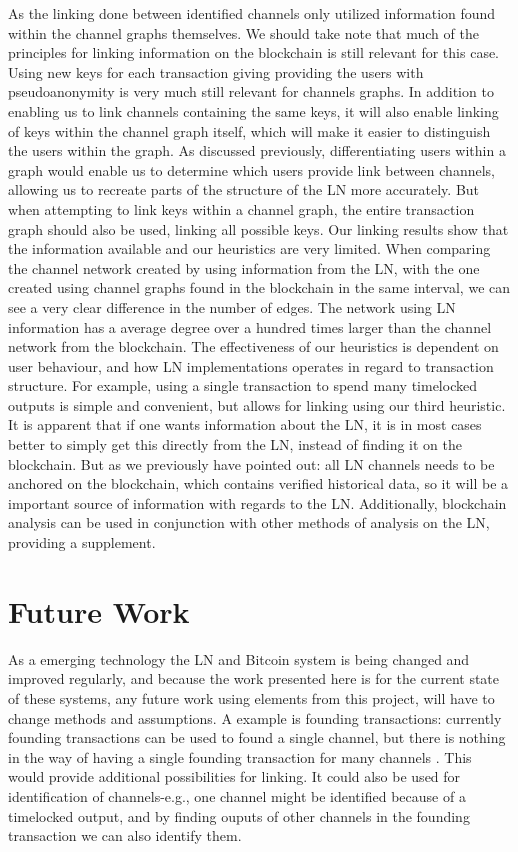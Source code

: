 As the linking done between identified channels only utilized information found within the channel graphs themselves. We should take note that much of the principles for linking information on the blockchain is still relevant for this case. Using new keys for each transaction giving providing the users with pseudoanonymity is very much still relevant for channels graphs. In addition to enabling us to link channels containing the same keys, it will also enable linking of keys within the channel graph itself, which will make it easier to distinguish the users within the graph. As discussed previously, differentiating users within a graph would enable us to determine which users provide link between channels, allowing us to recreate parts of the structure of the LN more accurately. But when attempting to link keys within a channel graph, the entire transaction graph should also be used, linking all possible keys. Our linking results show that the information available and our heuristics are very limited. When comparing the channel network created by using information from the LN, with the one created using channel graphs found in the blockchain in the same interval, we can see a very clear difference in the number of edges. The network using LN information has a average degree over a hundred times larger than the channel network from the blockchain. The effectiveness of our heuristics is dependent on user behaviour, and how LN implementations operates in regard to transaction structure. For example, using a single transaction to spend many timelocked outputs is simple and convenient, but allows for linking using our third heuristic.
\\


It is apparent that if one wants information about the LN, it is in most cases better to simply get this directly from the LN, instead of finding it on the blockchain.
But as we previously have pointed out: all LN channels needs to be anchored on the blockchain, which contains verified historical data, so it will be a important source of information with regards to the LN. 
Additionally, blockchain analysis can be used in conjunction with other methods of analysis on the LN, providing a supplement. 

\section{Future Work}
\label{sec:future}

As a emerging technology the LN and Bitcoin system is being changed and improved regularly, and because the work presented here is for the current state of these systems, any future work using elements from this project, will have to change methods and assumptions.
A example is founding transactions: currently founding transactions can be used to found a single channel, but there is nothing in the way of having a single founding transaction for many channels \cite{multi_channel_founding}.
This would provide additional possibilities for linking.
It could also be used for identification of channels-e.g., one channel might be identified because of a timelocked output, and by finding ouputs of other channels in the founding transaction we can also identify them.
\\

